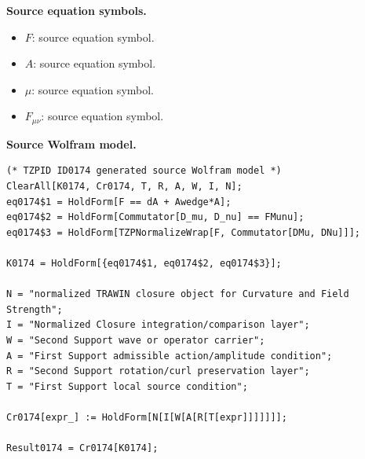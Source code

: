 \begin{minipage}[t]{0.49\linewidth}
\begingroup
\small
\raggedright
\textbf{Source equation symbols.}\par
\begin{itemize}[leftmargin=1.35em,itemsep=1pt,topsep=1pt,parsep=0pt]
    \item $F$: source equation symbol.
    \item $A$: source equation symbol.
    \item $\mu$: source equation symbol.
    \item $F_{\mu\nu}$: source equation symbol.
\end{itemize}
\endgroup
\end{minipage}\hfill
\begin{minipage}[t]{0.47\linewidth}
\begingroup
\scriptsize
\raggedright
\textbf{Source Wolfram model.}\par
\begin{Verbatim}[fontsize=\tiny,breaklines=true,breakanywhere=true]
(* TZPID ID0174 generated source Wolfram model *)
ClearAll[K0174, Cr0174, T, R, A, W, I, N];
eq0174$1 = HoldForm[F == dA + Awedge*A];
eq0174$2 = HoldForm[Commutator[D_mu, D_nu] == FMunu];
eq0174$3 = HoldForm[TZPNormalizeWrap[F, Commutator[DMu, DNu]]];

K0174 = HoldForm[{eq0174$1, eq0174$2, eq0174$3}];

N = "normalized TRAWIN closure object for Curvature and Field Strength";
I = "Normalized Closure integration/comparison layer";
W = "Second Support wave or operator carrier";
A = "First Support admissible action/amplitude condition";
R = "Second Support rotation/curl preservation layer";
T = "First Support local source condition";

Cr0174[expr_] := HoldForm[N[I[W[A[R[T[expr]]]]]]];

Result0174 = Cr0174[K0174];
\end{Verbatim}
\endgroup
\end{minipage}

